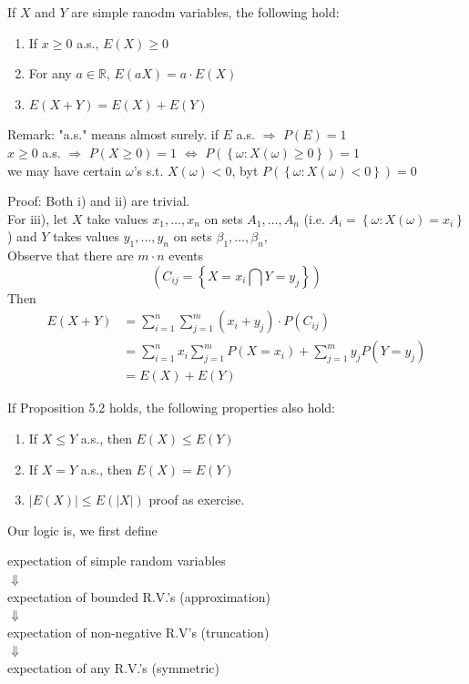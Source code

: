 \begin{proposition}
    If $X$ and $Y$ are simple ranodm variables, the following hold:
    \begin{enumerate}[label = \roman*)]
        \item If $x\geq 0$ a.s., $E(X) \geq 0$
        \item For any $a \in \mathbb{R}$, $E(aX) = a \cdot E(X)$
        \item $E(X+Y) = E(X)+E(Y)$
    \end{enumerate}
    Remark: "a.s." means almost surely.
    if $E$ a.s. $\Rightarrow$ $P(E) = 1$
    \\  $x \geq 0$ a.s. $\Rightarrow$ $P(X \geq 0) = 1$ $\Leftrightarrow$ $P(\left\{\omega: X(\omega) \geq 0\right\})=1$
    \\we may have certain $\omega$'s s.t. $X(\omega) < 0$, byt $P(\left\{\omega: X(\omega) < 0\right\}) = 0$
\end{proposition}

Proof: Both i) and ii) are trivial.
\\For iii), let $X$ take values $x_1, \dots, x_n$ on sets $A_1,\dots, A_n$ (i.e. $A_i = \left\{\omega: X(\omega) = x_i\right\}$) and $Y$ takes values $y_1, \dots, y_n$ on sets $\beta_1, \dots, \beta_n$,
\\Observe that there are $m\cdot n$ events
\[(C_{ij} = \left\{X = x_i \bigcap Y = y_j \right\})\]
Then
\begin{align*}
    E(X+Y) &= \sum_{i=1}^{n}\sum_{j=1}^{m} (x_i+y_j)\cdot P(C_{ij})\\
    &= \sum_{i=1}^{n}x_i \sum_{j=1}^{m} P(X=x_i)+\sum_{j=1}^{m}y_j P(Y=y_j)\\
    &= E(X)+E(Y)
\end{align*}

\begin{lemma}[][5.2.1]
    If Proposition 5.2 holds, the following properties also hold:
    \begin{enumerate}[label = \roman*), start=4]
        \item If $X \leq Y$ a.s., then $E(X) \leq E(Y)$
        \item If $X=Y$ a.s., then $E(X) = E(Y)$
        \item $\left|E(X)\right| \leq E(\left|X\right|)$
        proof as exercise.
    \end{enumerate}
\end{lemma}

Our logic is, we first define 
\begin{center}
    expectation of simple random variables
    \\$\Downarrow$
    \\expectation of bounded R.V.'s (approximation)
    \\$\Downarrow$
    \\expectation of non-negative R.V's (truncation)
    \\$\Downarrow$
    \\expectation of any R.V.'s (symmetric)
\end{center}

